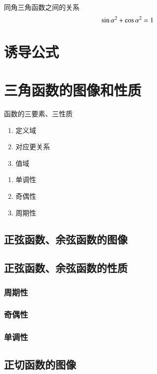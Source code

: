\begin{conclusion}
\begin{definition}{同角三角函数之间的关系}
	\begin{equation}
		{\sin{\alpha}}^2 + {\cos{\alpha}}^2 = 1\\
	\end{equation}
\end{definition}

\section{诱导公式}



\section{三角函数的图像和性质}

\begin{remark}
函数的三要素、三性质
\begin{enumerate}
\item 定义域
\item 对应更关系
\item 值域
\end{enumerate}
\begin{enumerate}
\item 单调性
\item 奇偶性
\item 周期性
\end{enumerate}
\end{remark}

\subsection{正弦函数、余弦函数的图像}
\subsection{正弦函数、余弦函数的性质}
\subsubsection{周期性}
\subsubsection{奇偶性}
\subsubsection{单调性}

\subsection{正切函数的图像}

\end{conclusion}
